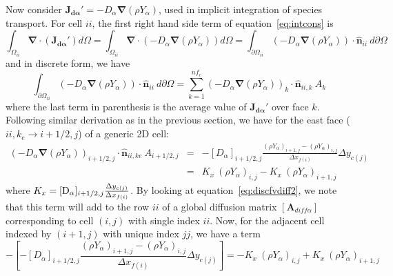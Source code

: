 \documentclass[12pt]{article}
\begin{document}
Now consider $ \mathbf{J_{d \alpha}'} = - D_\alpha \boldsymbol{\nabla} \left(\rho Y_\alpha \right)$, used in implicit integration of species transport. For cell $ii$, the first right hand side term of equation~\eqref{eq:intcons} is
%
\begin{equation}
  \int_{\Omega_{ii}} { \boldsymbol{\nabla} \cdot \left(  \mathbf{J_{d \alpha}'} \right)  } d \Omega =
  \int_{\Omega_{ii}} { \boldsymbol{\nabla} \cdot \left( -  D_\alpha \boldsymbol{\nabla} \left( \rho Y_\alpha \right) \right)  } d \Omega =
  \int_{\partial \Omega_{ii}} {\left( -  D_\alpha \boldsymbol{\nabla} \left( \rho Y_\alpha \right) \right) \cdot \hat{\mathbf{n}}_{ii} } \: d \partial \Omega
\end{equation}
%
and in discrete form, we have
%
\begin{equation}
    \int_{\partial \Omega_{ii}} {\left( -  D_\alpha \boldsymbol{\nabla} \left( \rho Y_\alpha \right) \right) \cdot \hat{\mathbf{n}}_{ii} } \: d \partial \Omega = \sum^{nf_c}_{k=1}
    \left( -  D_\alpha \boldsymbol{\nabla} \left( \rho Y_\alpha \right) \right)_k \cdot \hat{\mathbf{n}}_{ii,k} \: A_k \label{eq:discfvdiff2}
\end{equation}
%
where the last term in parenthesis is the average value of $ \mathbf{J_{d \alpha}'} $ over face $k$. Following similar derivation as in the previous section, we have for the east face ($ii,k_e \rightarrow i+1/2,j$) of a generic 2D cell:
%
\begin{eqnarray}
   \left( - D_\alpha \boldsymbol{\nabla} \left( \rho Y_\alpha \right) \right)_{i+1/2,j} \cdot \hat{\mathbf{n}}_{ii,ke} \: A_{i+1/2,j} & = &
   -[D_\alpha]_{i+1/2,j} \frac{ \left( \rho Y_\alpha \right)_{i+1,j} - \left( \rho Y_\alpha \right)_{i,j} } {\Delta x_{f(i)}} \Delta y_{c(j)}  \nonumber \\
   & = &  K_x \:\left( \rho Y_\alpha \right)_{i,j}-K_x \: \left( \rho Y_\alpha \right)_{i+1,j} \label{eq:diffii2}
\end{eqnarray}
where $K_x=[\mbox{D}_\alpha]_{i+1/2,j} \frac{\Delta y_{c(j)}}{\Delta x_{f(i)}}$. By looking at equation~\eqref{eq:discfvdiff2}, we note that this term will add to the row $ii$ of a global diffusion matrix $\left[ \mathbf{A}_{diff \alpha} \right]$ corresponding to cell $(i,j)$ with single index $ii$. Now, for the adjacent cell indexed by $(i+1,j)$ with unique index $jj$, we have a term
%
\begin{equation}
   - \left[ -[D_\alpha]_{i+1/2,j} \frac{\left( \rho Y_\alpha \right)_{i+1,j} - \left( \rho Y_\alpha \right)_{i,j}}{\Delta x_{f(i)}} \Delta y_{c(j)} \right] = -K_x \: \left( \rho Y_\alpha \right)_{i,j}+K_x \: \left( \rho Y_\alpha \right)_{i+1,j} \label{eq:diffjj2}
\end{equation}
\end{document}

